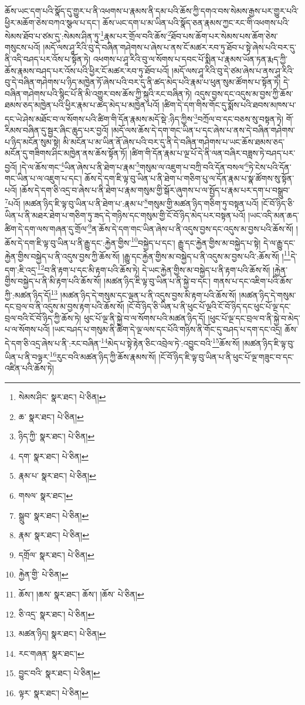 ཆོས་ཡང་དག་པའི་སྣོད་དུ་གྱུར་པ་ནི་འཕགས་པ་རྣམས་ནི་དམ་པའི་ཆོས་ཀྱི་དགའ་བས་སེམས་རྒྱས་པར་གྱུར་པའི་ཕྱིར་མཆོག་ཅེས་བཀའ་སྩལ་པ་དང་། ཆོས་ཡང་དག་པ་མ་ཡིན་པའི་སྣོད་ཅན་རྣམས་ཀྱང་རང་གི་འཕགས་པའི་སེམས་ཐོབ་པ་ཙམ་དུ་:སེམས་ཤིན་ཏུ་\footnote{སེམས་ཤིང་  སྣར་ཐང་།  པེ་ཅིན། }རྣམ་པར་གྲོལ་བའི་ཆོས་\footnote{ཆ་  སྣར་ཐང་།  པེ་ཅིན། }ཐོབ་པས་ཆོག་པར་སེམས་པས་ཆོག་ཅེས་གསུངས་པའོ། །མདོ་ལས་ཤཱ་རིའི་བུ་དེ་བཞིན་གཤེགས་པ་ཞེས་པ་ནས་ངོ་མཚར་རབ་ཏུ་ཐོབ་པ་སྟེ་ཞེས་པའི་བར་དུ་ནི་འདི་བཤད་པར་འོས་པ་སྟོན་ཏེ། འཕགས་པ་ཤཱ་རིའི་བུ་ལ་སོགས་པ་དབང་པོ་སྨིན་པ་རྣམས་ཡོན་ཏན་རྨད་ཀྱི་ཆོས་རྣམས་བཤད་པར་འོས་པའི་ཕྱིར་ངོ་མཚར་རབ་ཏུ་ཐོབ་པའོ། །མདོ་ལས་ཤཱ་རིའི་བུ་དེ་ཙམ་ཞེས་པ་ནས་ཤཱ་རིའི་བུ་དེ་བཞིན་གཤེགས་པ་ཉིད་མཁྱེན་ཏོ་ཞེས་པའི་བར་དུ་ནི་ཚད་མེད་པའི་རྣམ་པ་ཕུན་སུམ་ཚོགས་པ་སྟོན་ཏེ། དེ་བཞིན་གཤེགས་པའི་སྙིང་པོ་ནི་མི་འགྱུར་བས་ཆོས་ཀྱི་སྐུའི་རང་བཞིན་ཏེ། འདུས་བྱས་དང་འདུས་མ་བྱས་ཀྱི་ཆོས་ཐམས་ཅད་མཁྱེན་པའི་ཕྱིར་རྣམ་པ་ཚད་མེད་པ་མཁྱེན་པའོ། །ཚིག་དེ་དག་གིས་གོང་དུ་སྨོས་པའི་ཐབས་མཁས་པ་དང་ཡེ་ཤེས་མཐོང་བ་ལ་སོགས་པའི་ཚིག་གི་དོན་རྣམས་མདོ་སྡེ་:ཉིད་ཀྱིས་\footnote{ཉིད་ཀྱི་  སྣར་ཐང་།  པེ་ཅིན། }བཀྲོལ་བ་དང་བཅས་སུ་བསྟན་ཏེ། གོ་རིམས་བཞིན་དུ་སྦྱར་ཞིང་ཆུད་པར་བྱའོ། །མདོ་ལས་ཆོས་དེ་དག་གང་ཡིན་པ་དང་ཞེས་པ་ནས་དེ་བཞིན་གཤེགས་པ་ཉིད་མངོན་སུམ་སྟེ། མི་མངོན་པ་མ་ཡིན་ནོ་ཞེས་པའི་བར་དུ་ནི་དེ་བཞིན་གཤེགས་པ་ཡང་ཆོས་ཐམས་ཅད་མངོན་དུ་གཟིགས་ཤིང་མཁྱེན་ནས་ཆོས་སྟོན་ཏོ། །ཚིག་གི་དོན་རྣམ་པ་ལྔ་པོ་དེ་ནི་ལན་བཞིར་བཟླས་ཏེ་བཤད་པར་བྱའོ། །དེ་ལ་ཆོས་གང་\footnote{དག་  སྣར་ཐང་།  པེ་ཅིན། }ཡིན་ཞེས་པ་ནི་ཐེག་པ་རྣམ་\footnote{རྣམ་པ་  སྣར་ཐང་།  པེ་ཅིན། }གསུམ་ལ་འཇུག་པ་བཀྲི་བའི་དོན་བསལ་\footnote{གསལ་  སྣར་ཐང་། }ཏེ་ངེས་པའི་དོན་གང་ཡིན་པ་ལ་འཇུག་པ་དང་། ཆོས་དེ་དག་ཇི་ལྟ་བུ་ཡིན་པ་ནི་ཐེག་པ་གཅིག་པུ་ལ་དོན་རྣམ་པ་སྣ་ཚོགས་སུ་སྟོན་པའོ། །ཆོས་དེ་དག་ཅི་འདྲ་བ་ཞེས་པ་ནི་ཐེག་པ་རྣམ་གསུམ་གྱི་སྒོར་ཞུགས་པ་ལ་སྤྱོད་པ་རྣམ་པར་དག་པ་བསྒྲུབ་\footnote{སྒྲུབ་  སྣར་ཐང་།  པེ་ཅིན། }པའོ། །མཚན་ཉིད་ཇི་ལྟ་བུ་ཡིན་པ་ནི་ཐེག་པ་:རྣམ་པ་\footnote{རྣམ་  སྣར་ཐང་།  པེ་ཅིན། }གསུམ་གྱི་མཚན་ཉིད་གཅིག་ཏུ་བསྟན་པའོ། །ངོ་བོ་ཉིད་ཅི་ཡིན་པ་ནི་མཐར་ཐེག་པ་གཅིག་ཏུ་ཟད་དེ་གཉིས་དང་གསུམ་གྱི་ངོ་བོ་ཉིད་མེད་པར་བསྟན་པའོ། །ཡང་འདི་མན་ཆད་ཚིག་དེ་དག་ལས་གཞན་དུ་གྲོལ་\footnote{དགྲོལ་  སྣར་ཐང་།  པེ་ཅིན། }ན་ཆོས་དེ་དག་གང་ཡིན་ཞེས་པ་ནི་འདུས་བྱས་དང་འདུས་མ་བྱས་པའི་ཆོས་སོ། །ཆོས་དེ་དག་ཇི་ལྟ་བུ་ཡིན་པ་ནི་རྒྱུ་དང་:རྐྱེན་གྱིས་\footnote{རྐྱེན་གྱི་  པེ་ཅིན། }བསྐྱེད་པ་དང་། རྒྱུ་དང་རྐྱེན་གྱིས་མ་བསྐྱེད་པ་སྟེ། དེ་ལ་རྒྱུ་དང་རྐྱེན་གྱིས་བསྐྱེད་པ་ནི་འདུས་བྱས་ཀྱི་ཆོས་སོ། །རྒྱུ་དང་རྐྱེན་གྱིས་མ་བསྐྱེད་པ་ནི་འདུས་མ་བྱས་པའི་:ཆོས་སོ། །\footnote{ཆོས་། །ཆས་  སྣར་ཐང་། ཆོས་། །ཆོས་  པེ་ཅིན། }དེ་དག་:ཇི་འདྲ་\footnote{ཅི་འདྲ་  སྣར་ཐང་།  པེ་ཅིན། }བ་ནི་རྟག་པ་དང་མི་རྟག་པའི་ཆོས་ཏེ། དེ་ཡང་རྐྱེན་གྱིས་མ་བསྐྱེད་པ་ནི་རྟག་པའི་ཆོས་སོ། །རྐྱེན་གྱིས་བསྐྱེད་པ་ནི་མི་རྟག་པའི་ཆོས་སོ། །མཚན་ཉིད་ཇི་ལྟ་བུ་ཡིན་པ་ནི་སྐྱེ་བ་དང་། གནས་པ་དང་འཇིག་པའི་ཆོས་ཀྱི་:མཚན་ཉིད་དོ།\footnote{མཚན་ཉིད།  སྣར་ཐང་།  པེ་ཅིན། } །མཚན་ཉིད་དེ་གསུམ་དང་ལྡན་པ་ནི་འདུས་བྱས་མི་རྟག་པའི་ཆོས་སོ། །མཚན་ཉིད་དེ་གསུམ་དང་བྲལ་བ་ནི་འདུས་མ་བྱས་རྟག་པའི་ཆོས་སོ། །ངོ་བོ་ཉིད་ཅི་ཡིན་པ་ནི་ཕུང་པོ་ལྔའི་ངོ་བོ་ཉིད་དང་ཕུང་པོ་ལྔ་དང་བྲལ་བའི་ངོ་བོ་ཉིད་ཀྱི་ཆོས་ཏེ། ཕུང་པོ་ལྔ་ནི་སྐྱེ་བ་ལ་སོགས་པའི་མཚན་ཉིད་དོ། །ཕུང་པོ་ལྔ་དང་བྲལ་བ་ནི་སྐྱེ་བ་མེད་པ་ལ་སོགས་པའོ། །ཡང་བཤད་པ་གསུམ་ནི་ཚིག་དེ་ལྔ་ལས་དང་པོའི་གཉིས་ནི་གོང་དུ་བཤད་པ་དག་དང་འདྲ། ཆོས་དེ་དག་ཅི་འདྲ་ཞེས་པ་ནི་:རང་བཞིན་\footnote{རང་གཞན་  སྣར་ཐང་། }མེད་པ་སྟེ་རྟེན་ཅིང་འབྲེལ་ཏེ་:འབྱུང་བའི་\footnote{བྱུང་བའི་  སྣར་ཐང་།  པེ་ཅིན། }ཆོས་སོ། །མཚན་ཉིད་ཇི་ལྟ་བུ་ཡིན་པ་ནི་བལྟར་\footnote{ལྟར་  སྣར་ཐང་།  པེ་ཅིན། }རུང་བའི་མཚན་ཉིད་ཀྱི་ཆོས་རྣམས་སོ། །ངོ་བོ་ཉིད་ཇི་ལྟ་བུ་ཡིན་པ་ནི་ཕུང་པོ་ལྔ་གཟུང་བ་དང་འཛིན་པའི་ཆོས་ཏེ། 